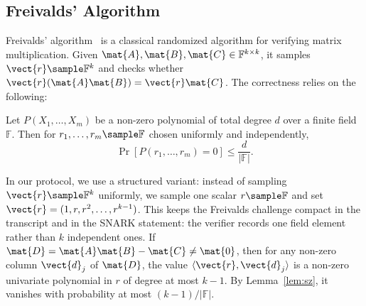 \subsection{Freivalds' Algorithm}
\label{sec:prelim-freivalds}

Freivalds' algorithm~\cite{freivalds1977probabilistic} is a classical randomized algorithm for verifying matrix multiplication.
Given $\mat{A}, \mat{B}, \mat{C} \in \mathbb{F}^{k \times k}$, it samples $\vect{r} \sample \mathbb{F}^k$ and checks whether $\vect{r}(\mat{A}\mat{B}) = \vect{r}\mat{C}$.
The correctness relies on the following:

\begin{lemma}\label{lem:sz}
Let $P(X_1, \ldots, X_m)$ be a non-zero polynomial of total degree $d$ over a finite field $\mathbb{F}$.
Then for $r_1, \ldots, r_m \sample \mathbb{F}$ chosen uniformly and independently,
\[
\Pr[P(r_1, \ldots, r_m) = 0] \le \frac{d}{|\mathbb{F}|}.
\]
\end{lemma}

In our protocol, we use a structured variant: instead of sampling $\vect{r} \sample \mathbb{F}^k$ uniformly, we sample one scalar $r \sample \mathbb{F}$ and set $\vect{r} = (1, r, r^2, \ldots, r^{k-1})$.
This keeps the Freivalds challenge compact in the transcript and in the SNARK
statement: the verifier records one field element rather than $k$ independent
ones. If $\mat{D} = \mat{A}\mat{B} - \mat{C} \neq \mat{0}$, then for any non-zero
column $\vect{d}_j$ of $\mat{D}$, the value $\langle \vect{r}, \vect{d}_j \rangle$ is a non-zero univariate polynomial in
$r$ of degree at most $k-1$.
By Lemma~\ref{lem:sz}, it vanishes with probability at most $(k-1)/|\mathbb{F}|$.
